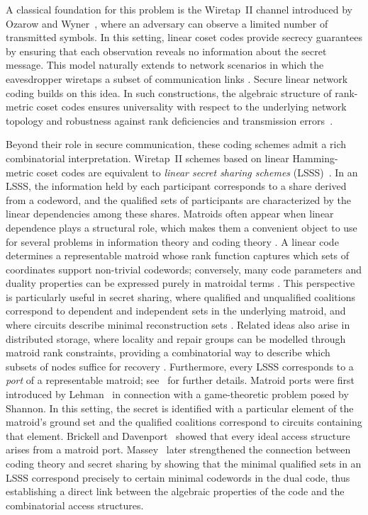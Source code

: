 \documentclass[onecolumn,draftclsnofoot,12pt]{IEEEtran}
\theoremstyle{plain} %
\theoremstyle{definition}
\begin{document}
A classical foundation for this problem is the Wiretap~II channel introduced by Ozarow and Wyner~\cite{OzarowWyner}, where an adversary can observe a limited number of transmitted symbols. In this setting, linear coset codes provide secrecy guarantees by ensuring that each observation reveals no information about the secret message. This model naturally extends to network scenarios in which the eavesdropper wiretaps a subset of communication links \cite{securenetwork}. Secure linear network coding builds on this idea. In such constructions, the algebraic structure of rank-metric coset codes ensures universality with respect to the underlying network topology and robustness against rank deficiencies and transmission errors~\cite{4608992,Universal,Emina}.

Beyond their role in secure communication, these coding schemes admit a rich combinatorial interpretation. Wiretap~II schemes based on linear Hamming-metric coset codes are equivalent to \emph{linear secret sharing schemes} (LSSS)~\cite{shamir79,Blakley,10.1007/978-3-642-20901-7_2,JunKURIHARA2012,1397965}. In an LSSS, the information held by each participant corresponds to a share derived from a codeword, and the qualified sets of participants are characterized by the linear dependencies among these shares. Matroids often appear when linear dependence plays a structural role, which makes them a convenient object to use for several problems in information theory and coding theory \cite{whitney35,Oxley}. A linear code determines a representable matroid whose rank function captures which sets of coordinates support non-trivial codewords; conversely, many code parameters and duality properties can be expressed purely in matroidal terms \cite{greene}. This perspective is particularly useful in secret sharing, where qualified and unqualified coalitions correspond to dependent and independent sets in the underlying matroid, and where circuits describe minimal reconstruction sets \cite{farre_padro2007,Cramer_Damgaard_Nielsen_2015}. Related ideas also arise in distributed storage, where locality and repair groups can be modelled through matroid rank constraints, providing a combinatorial way to describe which subsets of nodes suffice for recovery \cite{Freij-Hollanti2018}. Furthermore, every LSSS corresponds to a \emph{port} of a representable matroid; see~\cite{farre_padro2007} for further details. Matroid ports were first introduced by Lehman~\cite{Lehman} in connection with a game-theoretic problem posed by Shannon. In this setting, the secret is identified with a particular element of the matroid's ground set and the qualified coalitions correspond to circuits containing that element. Brickell and Davenport~\cite{brickell_davenport} showed that every ideal access structure arises from a matroid port. Massey~\cite{Massey1999MinimalCA} later strengthened the connection between coding theory and secret sharing by showing that the minimal qualified sets in an LSSS correspond precisely to certain minimal codewords in the dual code, thus establishing a direct link between the algebraic properties of the code and the combinatorial access structures.
\end{document}
